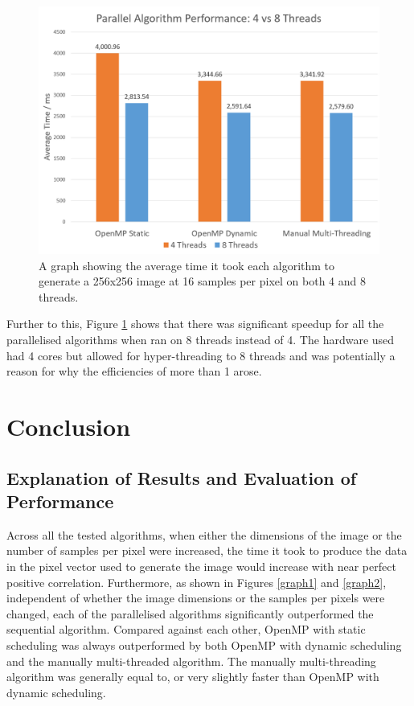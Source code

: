 \documentclass[12pt,journal,transmag]{IEEEtran}
\begin{document}
	\begin{figure}[!h]
		\centering
		\includegraphics[width=\columnwidth]{IMAGES/threadcomparison}
		\caption{A graph showing the average time it took each algorithm to generate a 256x256 image at 16 samples per pixel on both 4 and 8 threads.}
		\label{graph4}
	\end{figure}

	Further to this, Figure \ref{graph4} shows that there was significant speedup for all the parallelised algorithms when ran on 8 threads instead of 4. The hardware used had 4 cores but allowed for hyper-threading to 8 threads and was potentially a reason for why the efficiencies of more than 1 arose.
	
	\section{Conclusion}
	\subsection{Explanation of Results and Evaluation of Performance}
	Across all the tested algorithms, when either the dimensions of the image or the number of samples per pixel were increased, the time it took to produce the data in the pixel vector used to generate the image would increase with near perfect positive correlation. Furthermore, as shown in Figures \ref{graph1} and \ref{graph2}, independent of whether the image dimensions or the samples per pixels were changed, each of the parallelised algorithms significantly outperformed the sequential algorithm. Compared against each other, OpenMP with static scheduling was always outperformed by both OpenMP with dynamic scheduling	 and the manually multi-threaded algorithm. The manually multi-threading algorithm was generally equal to, or very slightly faster than OpenMP with dynamic scheduling.
	
\end{document}
